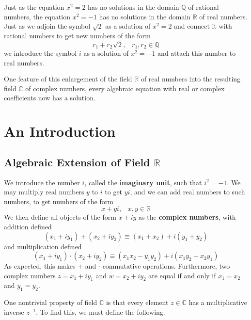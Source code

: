 \documentclass{article}
\begin{document}
\title{}
\author{Muchang Bahng}
\date{Spring 2025}

\maketitle
\tableofcontents
\pagebreak

  Just as the equation $x^2 = 2$ has no solutions in the domain $\mathbb{Q}$ of rational numbers, the equation $x^2 = -1$ has no solutions in the domain $\mathbb{R}$ of real numbers. Just as we adjoin the symbol $\sqrt{2}$ as a solution of $x^2 = 2$ and connect it with rational numbers to get new numbers of the form 
  \[r_1 + r_2 \sqrt{2}, \;\;\; r_1, r_2 \in \mathbb{Q}\]
  we introduce the symbol $i$ as a solution of $x^2 = -1$ and attach this number to real numbers. 

  One feature of this enlargement of the field $\mathbb{R}$ of real numbers into the resulting field $\mathbb{C}$ of complex numbers, every algebraic equation with real or complex coefficients now has a solution. 

\section{An Introduction}

  \subsection[Algebraic Extension of Field R]{Algebraic Extension of Field $\mathbb{R}$}

  We introduce the number $i$, called the \textbf{imaginary unit}, such that $i^2 = -1$. We may multiply real numbers $y$ to $i$ to get $yi$, and we can add real numbers to such numbers, to get numbers of the form 
  \[x + yi, \;\;\; x, y \in \mathbb{R}\]
  We then define all objects of the form $x + iy$ as the \textbf{complex numbers}, with addition defined
  \[(x_1 + i y_1) + (x_2 + i y_2) \equiv (x_1 + x_2) + i (y_1 + y_2)\]
  and multiplication defined
  \[(x_1 + i y_1) \cdot (x_2 + i y_2) \equiv (x_1 x_2 - y_1 y_2) + i (x_1 y_2 + x_2 y_1)\]
  As expected, this makes $+$ and $\cdot$ commutative operations. Furthermore, two complex numbers $z = x_1 + i y_1$ and $w = x_2 + i y_2$ are equal if and only if $x_1 = x_2$ and $y_1 = y_2$. 

  One nontrivial property of field $\mathbb{C}$ is that every element $z \in \mathbb{C}$ has a multiplicative inverse $z^{-1}$. To find this, we must define the following. 
\end{document}
